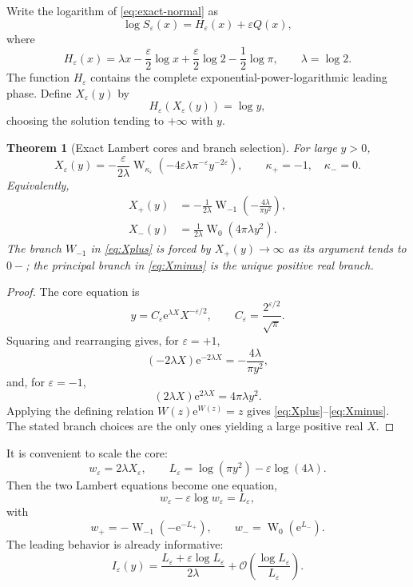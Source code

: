 \documentclass[11pt]{article}
\newtheorem{theorem}{Theorem}[section]
\theoremstyle{definition}
\theoremstyle{remark}
\newcommand{\eps}{\varepsilon}
\newcommand{\lam}{\lambda}
\newcommand{\e}{\mathrm e}
\newcommand{\bigO}{\mathcal O}
\newcommand{\W}{\operatorname{W}}
\begin{document}
Write the logarithm of \eqref{eq:exact-normal} as
\begin{equation}\label{eq:phase-decomposition}
 \log S_\eps(x)=H_\eps(x)+\eps Q(x),
\end{equation}
where
\begin{equation}\label{eq:Hdef}
 H_\eps(x)=\lam x-\frac\eps2\log x
 +\frac\eps2\log2-\frac12\log\pi,
 \qquad \lam=\log2.
\end{equation}
The function $H_\eps$ contains the complete exponential-power-logarithmic leading phase.  Define $X_\eps(y)$ by
\begin{equation}\label{eq:core-equation}
 H_\eps(X_\eps(y))=\log y,
\end{equation}
choosing the solution tending to $+\infty$ with $y$.

\begin{theorem}[Exact Lambert cores and branch selection]\label{thm:Lambert-core}
For large $y>0$,
\begin{equation}\label{eq:Lambert-unified}
 X_\eps(y)=-\frac{\eps}{2\lam}
 \W_{\kappa_\eps}\!\left(-4\eps\lam\pi^{-\eps}y^{-2\eps}\right),
 \qquad
 \kappa_+=-1,\quad \kappa_-=0.
\end{equation}
Equivalently,
\begin{align}
 X_+(y)&=-\frac1{2\lam}\W_{-1}\!\left(-\frac{4\lam}{\pi y^2}\right),\label{eq:Xplus}\\
 X_-(y)&=\frac1{2\lam}\W_0\!\left(4\pi\lam y^2\right).\label{eq:Xminus}
\end{align}
The branch $W_{-1}$ in \eqref{eq:Xplus} is forced by $X_+(y)\to\infty$ as its argument tends to $0-$; the principal branch in \eqref{eq:Xminus} is the unique positive real branch.
\end{theorem}

\begin{proof}
The core equation is
\[
 y=C_\eps\e^{\lam X}X^{-\eps/2},
 \qquad C_\eps=\frac{2^{\eps/2}}{\sqrt\pi}.
\]
Squaring and rearranging gives, for $\eps=+1$,
\[
 (-2\lam X)\e^{-2\lam X}=-\frac{4\lam}{\pi y^2},
\]
and, for $\eps=-1$,
\[
 (2\lam X)\e^{2\lam X}=4\pi\lam y^2.
\]
Applying the defining relation $W(z)\e^{W(z)}=z$ gives \eqref{eq:Xplus}--\eqref{eq:Xminus}.  The stated branch choices are the only ones yielding a large positive real $X$.
\end{proof}

It is convenient to scale the core:
\begin{equation}\label{eq:wLdef}
 w_\eps=2\lam X_\eps,
 \qquad
 L_\eps=\log(\pi y^2)-\eps\log(4\lam).
\end{equation}
Then the two Lambert equations become one equation,
\begin{equation}\label{eq:w-equation}
 w_\eps-\eps\log w_\eps=L_\eps,
\end{equation}
with
\begin{equation}\label{eq:w-W}
 w_+=-\W_{-1}(-\e^{-L_+}),
 \qquad
 w_-=\W_0(\e^{L_-}).
\end{equation}
The leading behavior is already informative:
\begin{equation}\label{eq:inverse-leading}
 I_\eps(y)=\frac{L_\eps+\eps\log L_\eps}{2\lam}
 +\bigO\!\left(\frac{\log L_\eps}{L_\eps}\right).
\end{equation}
\end{document}
